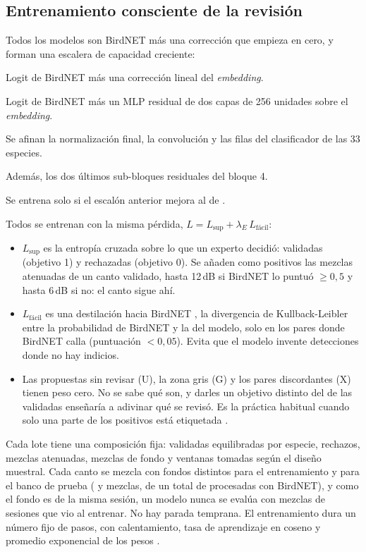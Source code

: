\subsection{Entrenamiento consciente de la revisión}\label{sec:entrenamiento}
Todos los modelos son BirdNET más una corrección que empieza en cero, y forman una escalera de capacidad creciente:
\begin{description}[leftmargin=1em]
  \item[Lineal.] Logit de BirdNET más una corrección lineal del \emph{embedding}.
  \item[MLP.] Logit de BirdNET más un MLP residual de dos capas de 256 unidades sobre el \emph{embedding}.
  \item[POST\_CONV.] Se afinan la normalización final, la convolución  y las filas del clasificador de las 33 especies.
  \item[Sub-bloques 4-3 y 4-4.] Además, los dos últimos sub-bloques residuales del bloque 4.
  \item[Bloque 4 completo.] Se entrena solo si el escalón anterior mejora al de .
\end{description}
Todos se entrenan con la misma pérdida, $L = L_{\text{sup}} + \lambda_E\,L_{\text{fácil}}$:
\begin{itemize}
  \item $L_{\text{sup}}$ es la entropía cruzada sobre lo que un experto decidió: validadas (objetivo 1) y rechazadas (objetivo 0). Se añaden como
        positivos las mezclas atenuadas de un canto validado, hasta 12\,dB si BirdNET lo puntuó $\geq 0{,}5$ y hasta 6\,dB si no: el canto sigue ahí.
  \item $L_{\text{fácil}}$ es una destilación hacia BirdNET \citep{hinton2015distilling}, la divergencia de Kullback-Leibler entre la probabilidad de BirdNET y la del modelo,
        solo en los pares donde BirdNET calla (puntuación $< 0{,}05$). Evita que el modelo invente detecciones donde no hay indicios.
  \item Las propuestas sin revisar (U), la zona gris (G) y los pares discordantes (X) tienen peso cero. No se sabe qué son, y darles un objetivo
        distinto del de las validadas enseñaría a adivinar qué se revisó. Es la práctica habitual cuando solo una parte de los positivos está
        etiquetada \citep{elkan2008pu}.
\end{itemize}
Cada lote tiene una composición fija: validadas equilibradas por especie, rechazos, mezclas atenuadas, mezclas de fondo y ventanas tomadas
según el diseño muestral. Cada canto se mezcla con fondos distintos para el entrenamiento y para el banco de prueba (\deepMixTrain{} y \deepMixTest{} mezclas, de un total de
\deepMixTotal{} procesadas con BirdNET), y como el fondo es de la misma sesión, un modelo nunca se evalúa con mezclas de sesiones que vio al entrenar. No hay parada temprana. El entrenamiento dura un número fijo de pasos, con calentamiento, tasa
de aprendizaje en coseno \citep{loshchilov2017sgdr} y promedio exponencial de los pesos \citep{polyak1992averaging}.

